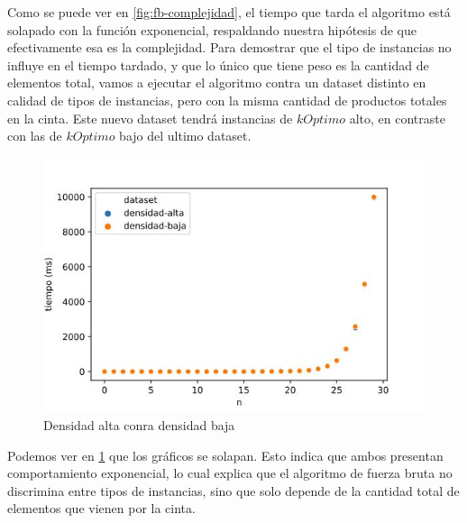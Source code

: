 \documentclass[10pt,a4paper]{article}
\begin{document}
Como se puede ver en \ref{fig:fb-complejidad}, el tiempo que tarda el algoritmo está solapado con la función exponencial, respaldando nuestra hipótesis de que efectivamente esa es la complejidad.
\newpage
Para demostrar que el tipo de instancias no influye en el tiempo tardado, y que lo único que tiene peso es la cantidad de elementos total, vamos a ejecutar el algoritmo contra un dataset distinto en calidad de tipos de instancias, pero con la misma cantidad de productos totales en la cinta. Este nuevo dataset tendrá instancias de $kOptimo$ alto, en contraste con las de $kOptimo$ bajo del ultimo dataset.
\newline
\begin{figure}[h!]
	\centering
		\includegraphics[scale=0.35]{img/fb-densidades.jpg}
		\caption{Densidad alta conra densidad baja}
		\label{fig:fb-densidad}
\end{figure}
\newline
Podemos ver en \ref{fig:fb-densidad} que los gráficos se solapan. Esto indica que ambos presentan comportamiento exponencial, lo cual explica que el algoritmo de fuerza bruta no discrimina entre tipos de instancias, sino que solo depende de la cantidad total de elementos que vienen por la cinta.
\newline
\end{document}
